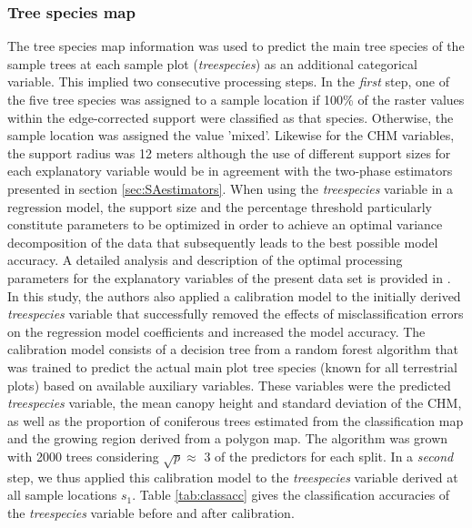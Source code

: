 \subsubsection{Tree species map}

The tree species map information was used to predict the main tree species of the sample trees at each sample plot (\textit{treespecies}) as an additional categorical variable. This implied two consecutive processing steps. In the \textit{first} step, one of the five tree species was assigned to a sample location if 100\% of the raster values within the edge-corrected support were classified as that species. Otherwise, the sample location was assigned the value 'mixed'. Likewise for the CHM variables, the support radius was 12 meters although the use of different support sizes for each explanatory variable would be in agreement with the two-phase estimators presented in section \ref{sec:SAestimators}. When using the \textit{treespecies} variable in a regression model, the support size and the percentage threshold particularly constitute parameters to be optimized in order to achieve an optimal variance decomposition of the data that subsequently leads to the best possible model accuracy. A detailed analysis and description of the optimal processing parameters for the explanatory variables of the present data set is provided in \citet{hill2017a}. In this study, the authors also applied a calibration model to the initially derived \textit{treespecies} variable that successfully removed the effects of misclassification errors on the regression model coefficients and increased the model accuracy. The calibration model consists of a decision tree from a random forest algorithm \citet{breiman2001} that was trained to predict the actual main plot tree species (known for all terrestrial plots) based on available auxiliary variables. These variables were the predicted \textit{treespecies} variable, the mean canopy height and standard deviation of the CHM, as well as the proportion of coniferous trees estimated from the classification map and the growing region derived from a polygon map. The algorithm was grown with 2000 trees considering $\sqrt{p} \approx$ 3 of the predictors for each split. In a \textit{second} step, we thus applied this calibration model to the \textit{treespecies} variable derived at all sample locations $s_1$. Table \ref{tab:classacc} gives the classification accuracies of the \textit{treespecies} variable before and after calibration.


